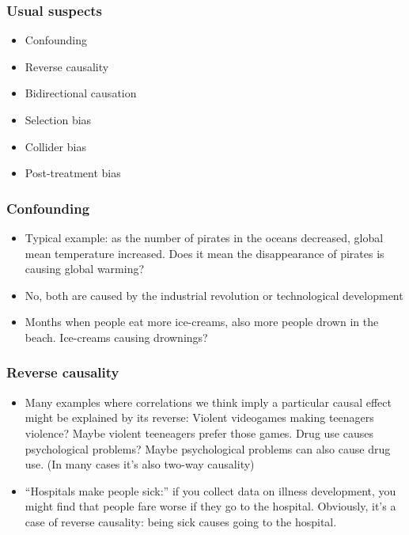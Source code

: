 \documentclass[aspectratio=43]{beamer}
\begin{document}
\begin{frame}
\frametitle{Usual suspects}
\centering

\begin{itemize}
  \item Confounding
  \item Reverse causality
  \item Bidirectional causation
  \item Selection bias
  \item Collider bias
  \item Post-treatment bias
\end{itemize}


\end{frame}

\begin{frame}
\frametitle{Confounding}
\centering

\begin{itemize}[<+->]
  \item Typical example: as the number of pirates in the oceans decreased, global mean temperature increased. Does it mean the disappearance of pirates is causing global warming?
  \item No, both are caused by the industrial revolution or technological development
  \item Months when people eat more ice-creams, also more people drown in the beach. Ice-creams causing drownings?
\end{itemize}

\end{frame}

\begin{frame}
\frametitle{Reverse causality}
\centering

\begin{itemize}[<+->]
  \item Many examples where correlations we think imply a particular causal effect might be explained by its reverse: Violent videogames making teenagers violence? Maybe violent teeneagers prefer those games. Drug use causes psychological problems? Maybe psychological problems can also cause drug use. (In many cases it's also two-way causality)
  \item ``Hospitals make people sick:'' if you collect data on illness development, you might find that people fare worse if they go to the hospital. Obviously, it's a case of reverse causality: being sick causes going to the hospital.
\end{itemize}

\end{frame}
\end{document}
